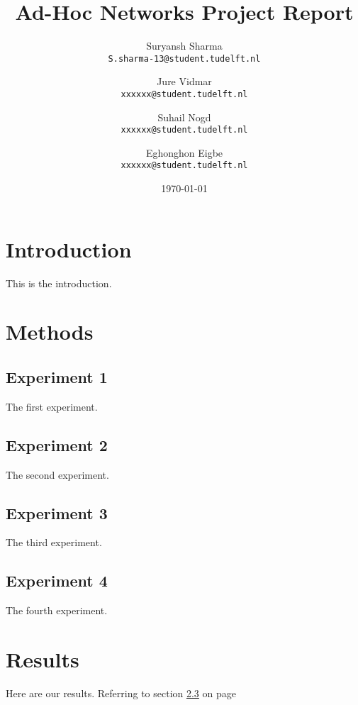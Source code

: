 \documentclass[a4paper,12pt]{article}
\begin{document}
\title{Ad-Hoc Networks Project Report}
\author{
	Suryansh Sharma \\ 
	\texttt{S.sharma-13@student.tudelft.nl}
 	\and 
	Jure Vidmar \\
	\texttt{xxxxxx@student.tudelft.nl} 
	\and
	Suhail Nogd \\
	\texttt{xxxxxx@student.tudelft.nl} 	
	 \and 
	Eghonghon Eigbe\\
	\texttt{xxxxxx@student.tudelft.nl} 
}

\date {\today}
\maketitle

\section{Introduction}
This is the introduction.

\section{Methods}

\subsection{Experiment 1}
\label{sec1}
The first experiment.

\subsection{Experiment 2}
The second experiment.

\subsection{Experiment 3}
\label{sec1}
The third experiment.

\subsection{Experiment 4}
The fourth experiment.

\section{Results}
Here are our results. Referring to section \ref{sec1} on page \pageref{sec1}
\end{document}
